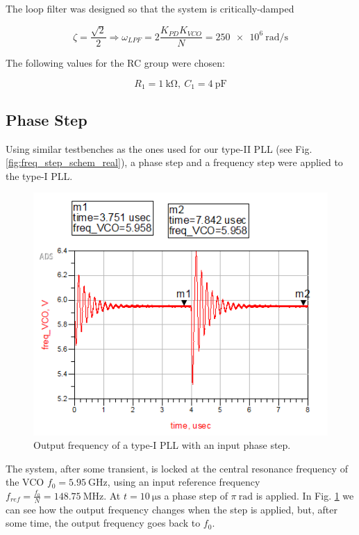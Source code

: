 \documentclass[lettersize,journal]{IEEEtran}
\begin{document}
The loop filter was designed so that the system is critically-damped

\begin{equation}
    \zeta=\frac{\sqrt{2}}{2} \Longrightarrow \omega_{LPF}=2\frac{K_{PD}K_{VCO}}{N}=\qty[per-mode=symbol]{250e6}{\radian\per\second}
\end{equation}

The following values for the RC group were chosen:

\[R_1=\qty{1}{\kilo\ohm},\ C_1=\qty{4}{\pico\farad}\]

\subsection{Phase Step}

Using similar testbenches as the ones used for our type-II PLL (see Fig. \ref{fig:freq_step_schem_real}), a phase step and a frequency step were applied to the type-I PLL.

\begin{figure}[!h]
    \centering
    \includegraphics[width=0.75\linewidth]{images/type_one_pll/phase_step_type_one.png}
    \caption{Output frequency of a type-I PLL with an input phase step.}
    \label{fig:type_one_phase_step}
\end{figure}

The system, after some transient, is locked at the central resonance frequency of the VCO $f_0=\qty{5.95}{\giga\hertz}$, using an input reference frequency $f_{ref}=\frac{f_0}{N}=\qty{148.75}{\mega\hertz}$. At $t=\qty{10}{\micro\second}$ a phase step of $\pi\ \unit{\radian}$ is applied. In Fig. \ref{fig:type_one_phase_step} we can see how the output frequency changes when the step is applied, but, after some time, the output frequency goes back to $f_0$.
\end{document}
